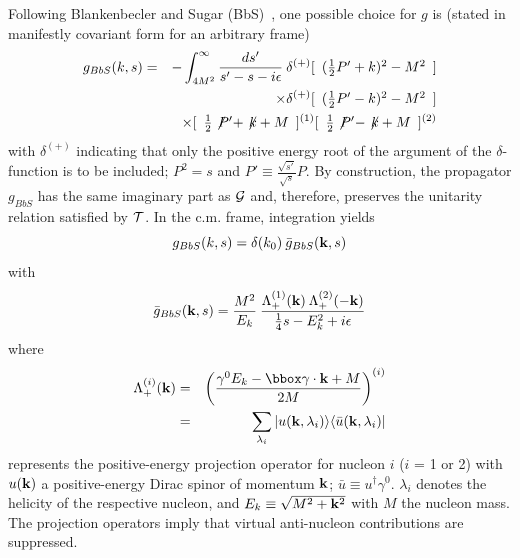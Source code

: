 Following
Blankenbecler and Sugar (BbS)~\cite{BS66},
 one possible choice for
 $g$ is
(stated in manifestly covariant form for an arbitrary frame)
\begin{eqnarray}
g_{BbS}(k,s)&=&-
\int_{4M^{2}}^{\infty}
\frac{ds'}{s'-s-i\epsilon}
\: \delta^{(+)}[\begin{array}{c} (\frac{1}{2}P'+k)^{2}-M^{2}\end{array}]
\nonumber \\ 
&&\times\delta^{(+)}[\begin{array}{c} (\frac{1}{2}P'-k)^{2}-M^{2}\end{array}]
\nonumber \\  
&&\times[\begin{array}{c} \frac{1}{2}\not\!P'+\not\!k+M\end{array}]^{(1)}
[\begin{array}{c} \frac{1}{2}\not\!P'-\not\!k+M\end{array}]^{(2)}
\label{21.7}
\end{eqnarray}
with $\delta^{(+)}$ indicating that only the positive energy root of the 
argument of the $\delta$-function is to be included; $P^2=s$ and
 $P'\equiv \frac{\sqrt{s'}}{\sqrt{s}} P$.
By construction, 
the propagator $g_{BbS}$ has the same 
imaginary part 
as ${\cal G}$ and, therefore, preserves the unitarity relation
satisfied by ${\cal T}$.
In the c.m. frame, integration yields
\begin{equation}
g_{BbS}(k,s)=\delta (k_{0})\: \bar{g}_{BbS}({\bf  k},s)
\label{21.8}
\end{equation}
with
\begin{equation} 
\bar{g}_{BbS}({\bf  k},s)=\frac{M^{2}}{E_{k}}\:
\frac{\Lambda_{+}^{(1)}({\bf  k})\:
\Lambda_{+}^{(2)}({\bf  -k})}
{\frac{1}{4}s-E^{2}_{k}+i\epsilon}
\label{21.9}
\end{equation}
where
\begin{eqnarray}
\Lambda^{(i)}_{+}({\bf  k})&=&
\left(\frac{\gamma^{0}E_{k}-{\bbox \gamma}\cdot{\bf  k}+M}{2M}\right)^{(i)}\\
                 &=&\sum_{\lambda_{i}}
              |u({\bf  k},\lambda_{i})\rangle 
               \langle \bar{u}({\bf  k},\lambda_{i})|
\label{21.11}
\end{eqnarray} 
represents
the positive-energy projection operator
for nucleon $i$ ($i$ = 1 or 2)
with $u({\bf  k})$ a positive-energy Dirac spinor of momentum
${\bf  k}$; $\bar{u}\equiv u^\dagger \gamma^0$.
$\lambda_{i}$ denotes the helicity of the respective nucleon, and 
  $E_{k}\equiv \sqrt{M^{2}+{\bf  k}^{2}}$ with $M$ the nucleon mass.
The projection operators imply that virtual anti-nucleon
contributions are suppressed. 

